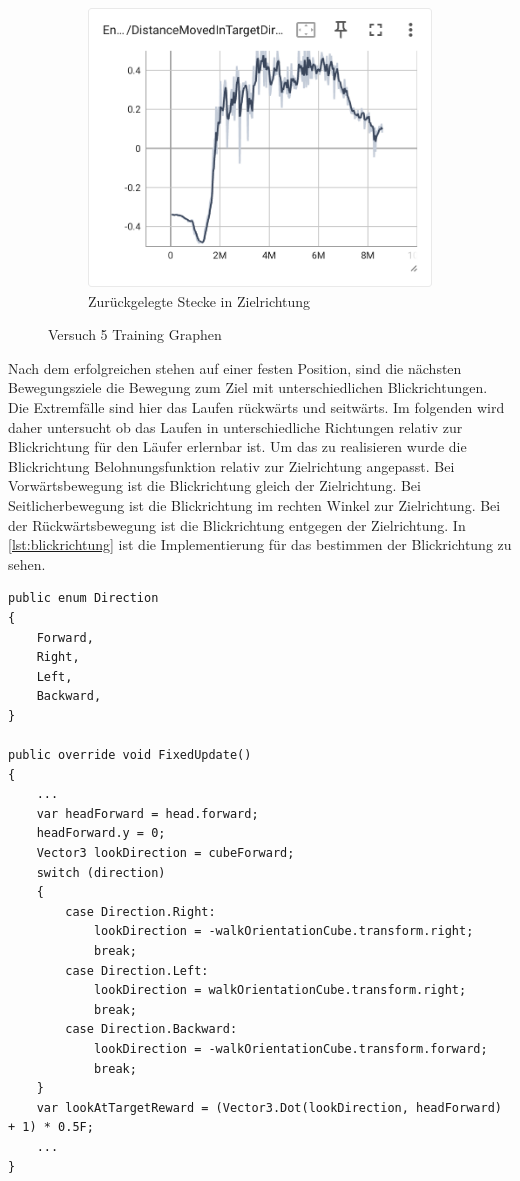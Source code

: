 \begin{figure}[H]
    \begin{subfigure}{.49\textwidth}
      \centering  
      \includegraphics[width=\textwidth]{img/128_move_target_dir}
      \caption{Zurückgelegte Stecke in Zielrichtung}
      \label{fig:128_move_target_dir}
    \end{subfigure}
  \caption{Versuch 5 Training Graphen}
  \label{fig:versuch5_training}
\end{figure}

Nach dem erfolgreichen stehen auf einer festen Position, sind die nächsten Bewegungsziele die Bewegung zum Ziel mit unterschiedlichen Blickrichtungen. Die Extremfälle sind hier das Laufen rückwärts und seitwärts.
Im folgenden wird daher untersucht ob das Laufen in unterschiedliche Richtungen relativ zur Blickrichtung für den Läufer erlernbar ist. Um das zu realisieren wurde die Blickrichtung Belohnungsfunktion relativ zur Zielrichtung angepasst. Bei Vorwärtsbewegung ist die Blickrichtung gleich der Zielrichtung. Bei Seitlicherbewegung ist die Blickrichtung im rechten Winkel zur Zielrichtung. Bei der Rückwärtsbewegung ist die Blickrichtung entgegen der Zielrichtung. In \ref{lst:blickrichtung} ist die Implementierung für das bestimmen der Blickrichtung zu sehen.

\begin{lstlisting}[caption={Blickrichtung Enum und Belohnung},captionpos=b,label={lst:blickrichtung}]
public enum Direction
{
    Forward,
    Right,
    Left,
    Backward,
}
    
public override void FixedUpdate()
{
    ...
    var headForward = head.forward;
    headForward.y = 0;
    Vector3 lookDirection = cubeForward;
    switch (direction)
    {
        case Direction.Right:
            lookDirection = -walkOrientationCube.transform.right;
            break;
        case Direction.Left:
            lookDirection = walkOrientationCube.transform.right;
            break;
        case Direction.Backward:
            lookDirection = -walkOrientationCube.transform.forward;
            break;
    }
    var lookAtTargetReward = (Vector3.Dot(lookDirection, headForward) + 1) * 0.5F;
    ...
}
\end{lstlisting}

